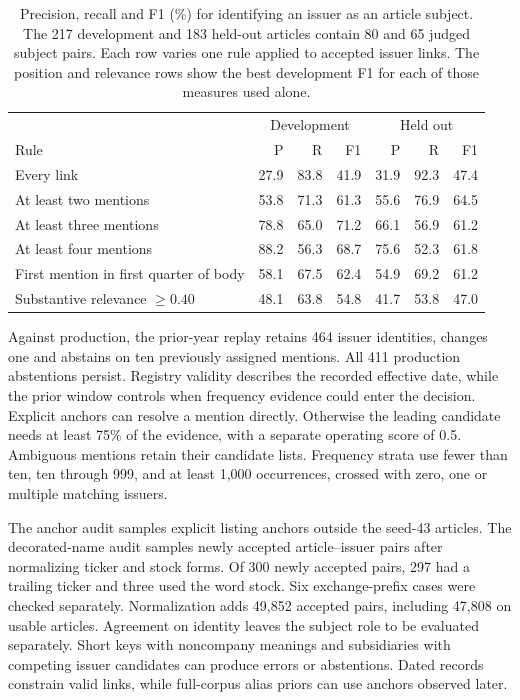 \begin{table}[t]
  \centering
  \small
  \caption{Precision, recall and F1 (\%) for identifying an issuer as an
    article subject. The 217 development and 183 held-out articles contain
    80 and 65 judged subject pairs. Each row varies one rule applied to
    accepted issuer links. The position and relevance rows show the best
  development F1 for each of those measures used alone.}
  \label{tab:app-focus-rules}
  \begin{tabular}{lrrrrrr}
    \toprule
    & \multicolumn{3}{c}{Development} & \multicolumn{3}{c}{Held out} \\
    Rule & P & R & F1 & P & R & F1 \\
    \midrule
    Every link & 27.9 & 83.8 & 41.9 & 31.9 & 92.3 & 47.4 \\
    At least two mentions & 53.8 & 71.3 & 61.3 & 55.6 & 76.9 & 64.5 \\
    At least three mentions & 78.8 & 65.0 & 71.2 & 66.1 & 56.9 & 61.2 \\
    At least four mentions & 88.2 & 56.3 & 68.7 & 75.6 & 52.3 & 61.8 \\
    First mention in first quarter of body & 58.1 & 67.5 & 62.4 &
    54.9 & 69.2 & 61.2 \\
    Substantive relevance $\geq 0.40$ & 48.1 & 63.8 & 54.8 & 41.7 &
    53.8 & 47.0 \\
    \bottomrule
  \end{tabular}
\end{table}

Against production, the prior-year replay retains 464 issuer identities,
changes one and abstains on ten previously assigned mentions. All 411
production abstentions persist. Registry validity describes the recorded
effective date, while the prior window controls when frequency evidence
could enter the decision. Explicit anchors can resolve a mention directly.
Otherwise the leading candidate needs at least 75\% of the evidence,
with a separate operating score of 0.5. Ambiguous mentions retain their
candidate lists. Frequency strata use fewer than ten, ten through 999,
and at least 1,000 occurrences, crossed with zero, one or multiple
matching issuers.

The anchor audit samples explicit listing anchors outside the seed-43
articles. The decorated-name audit samples newly accepted article--issuer
pairs after normalizing ticker and stock forms. Of 300 newly accepted
pairs, 297 had a trailing ticker and three used the word stock. Six
exchange-prefix cases were checked separately. Normalization adds
49,852 accepted pairs, including 47,808 on usable articles. Agreement
on identity leaves the subject role to be evaluated separately. Short
keys with noncompany meanings and subsidiaries with competing issuer
candidates can produce errors or abstentions. Dated records constrain
valid links, while full-corpus alias priors can use anchors observed later.

